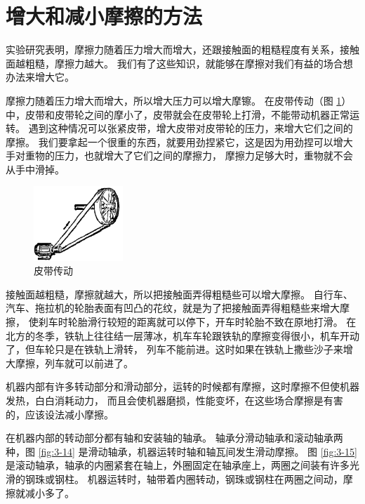 \section{增大和减小摩擦的方法}\label{sec:3-12}

实验研究表明，摩擦力随着压力增大而增大，还跟接触面的粗糙程度有关系，接触面越粗糙，摩擦力越大。
我们有了这些知识，就能够在摩擦对我们有益的场合想办法来增大它。

摩擦力随着压力增大而增大，所以增大压力可以增大摩镲。
在皮带传动（图 \ref{fig:3-13}）中，皮带和皮带轮之间的摩小了，皮带就会在皮带轮上打滑，不能带动机器正常运转。
遇到这种情况可以张紧皮带，增大皮带对皮带轮的压力，来增大它们之间的摩擦。
我们要拿起一个很重的东西，就要用劲捏紧它，这是因为用劲捏可以增大手对重物的压力，也就增大了它们之间的摩擦力，
摩擦力足够大时，重物就不会从手中滑掉。

\begin{figure}[htbp]
    \centering
    \includegraphics[width=0.3\textwidth]{../pic/czwl1-ch3-13}
    \caption{皮带传动}\label{fig:3-13}
\end{figure}

接触面越粗糙，摩擦就越大，所以把接触面弄得粗糙些可以增大摩擦。
自行车、汽车、拖拉机的轮胎表面有凹凸的花纹，就是为了把接触面弄得粗糙些来增大摩擦，
使刹车时轮胎滑行较短的距离就可以停下，开车时轮胎不致在原地打滑。
在北方的冬季，铁轨上往往结一层薄冰，机车车轮跟铁轨的摩擦变得很小，机车开动了，但车轮只是在铁轨上滑转，
列车不能前进。这时如果在铁轨上撒些沙子来增大摩擦，列车就可以前进了。

机器内部有许多转动部分和滑动部分，运转的时候都有摩擦，这时摩擦不但使机器发热，白白消耗动力，
而且会使机器磨损，性能变坏，在这些场合摩擦是有害的，应该设法减小摩擦。

在机器内部的转动部分都有轴和安装轴的轴承。
轴承分滑动轴承和滚动轴承两种，图 \ref{fig:3-14} 是滑动轴承，机器运转时轴和轴瓦间发生滑动摩擦。
图 \ref{fig:3-15} 是滚动轴承，轴承的内圈紧套在轴上，外圈固定在轴承座上，两圈之间装有许多光滑的钢珠或钢柱。
机器运转时，轴带着内圈转动，钢珠或钢柱在两圈之间动，摩擦就减小多了。

